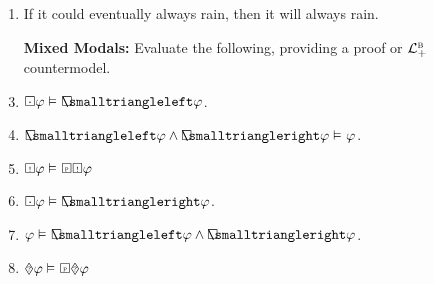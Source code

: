 \documentclass[a4paper, 11pt]{article}                  %
\begin{document}
\begin{enumerate}
    \item If it could eventually always rain, then it will always rain.

	\item[\bf Mixed Modals:] Evaluate the following, providing a proof or $\mathcal{L}^{\textsc{b}}_+$ countermodel.

    \item $\Inevitably\metaA \MLmodels[] \Openpast\metaA$.

    \item $\Openpast\metaA \wedge \Openfuture\metaA \MLmodels[] \metaA$.

    \item $\Will\metaA \MLmodels[] \Past\Will\metaA$

    \item $\Inevitably\metaA \MLmodels[] \Openfuture\metaA$.

    \item $\metaA \MLmodels[] \Openpast\metaA \wedge \Openfuture\metaA$.

    \item $\could\metaA \MLmodels[] \Past\could\metaA$


\end{enumerate}




\end{document}
